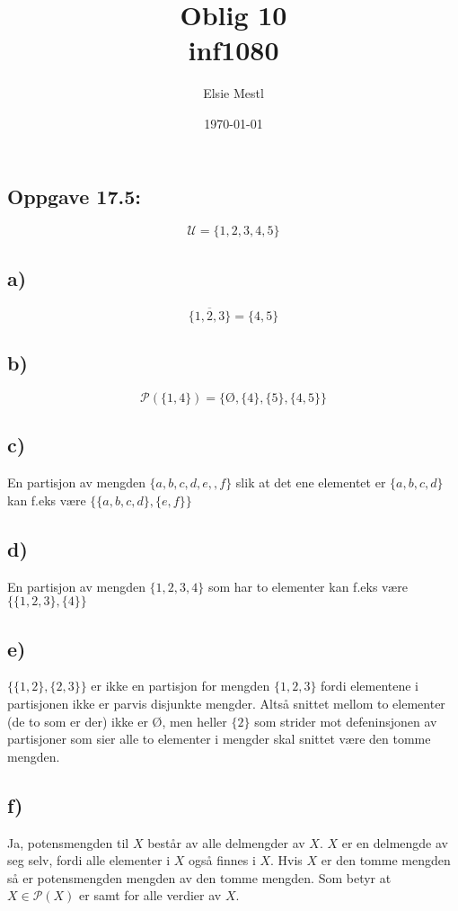 \documentclass[a4paper, norsk, 10pt]{article}
\date{\today}
\title{Oblig 10 \\ inf1080}
\author{Elsie Mestl}
\begin{document}
\maketitle
\begin{flushleft}

  \section*{Oppgave 17.5:}
  \[\mathcal{U} = \{1,2,3,4,5\}\]

  \subsection*{a)}
  \[\overline{\{1,2,3\}} = \{4,5\}\]

  \subsection*{b)}
  \[\mathcal{P}(\{1,4\}) = \{Ø, \{4\}, \{5\}, \{4,5\} \}\]

  \subsection*{c)}
  En partisjon av mengden $\{a, b, c, d, e, ,f\}$ slik at det ene elementet er $\{a, b, c, d\}$ kan f.eks være $\{\{a,b,c,d\}, \{e,f\}\}$


  \subsection*{d)}
    En partisjon av mengden $\{1, 2, 3, 4\}$ som har to elementer kan f.eks være $\{\{1,2,3\}, \{4\}\}$

    \subsection*{e)}
    $\{\{1,2\}, \{2,3\}\}$ er ikke en partisjon for mengden $\{1,2,3\}$ fordi elementene i partisjonen ikke er parvis disjunkte mengder. Altså snittet mellom to elementer (de to som er der) ikke er Ø, men heller $\{2\}$ som strider mot defeninsjonen av partisjoner som sier alle to elementer i mengder skal snittet være den tomme mengden. 

    \subsection*{f)}
    Ja, potensmengden til $X$ består av alle delmengder av $X$. $X$ er en delmengde av seg selv, fordi alle elementer i $X$ også finnes i $X$. Hvis $X$ er den tomme mengden så er potensmengden mengden av den tomme mengden. Som betyr at $X \in \mathcal{P}(X)$ er samt for alle verdier av $X$.



\end{flushleft}
\end{document}
